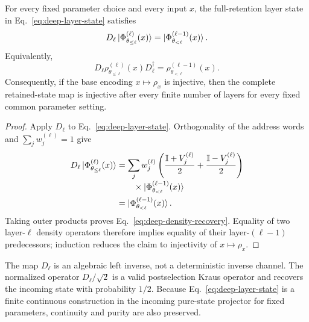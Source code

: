 \documentclass[pdflatex,sn-mathphys,NameDate,iicol]{sn-jnl}
\newcommand{\id}{\mathbb{I}}
\begin{document}
\begin{lemma}
\label{lem:deep-exact-recovery}
For every fixed parameter choice and every input $x$, the full-retention layer
state in Eq.~\eqref{eq:deep-layer-state} satisfies
\begin{equation}
 D_\ell\ket{\Phi_{\theta_{\le\ell}}^{(\ell)}(x)}
 =\ket{\Phi_{\theta_{<\ell}}^{(\ell-1)}(x)}.
 \label{eq:deep-vector-recovery}
\end{equation}
Equivalently,
\begin{equation}
 D_\ell\rho_{\theta_{\le\ell}}^{(\ell)}(x)D_\ell^\dagger
 =\rho_{\theta_{<\ell}}^{(\ell-1)}(x).
 \label{eq:deep-density-recovery}
\end{equation}
Consequently, if the base encoding $x\mapsto\rho_x$ is injective, then the
complete retained-state map is injective after every finite number of layers
for every fixed common parameter setting.
\end{lemma}

\begin{proof}
Apply $D_\ell$ to Eq.~\eqref{eq:deep-layer-state}. Orthogonality of the
address words and $\sum_jw_j^{(\ell)}=1$ give
\begin{align}
 D_\ell\ket{\Phi_{\theta_{\le\ell}}^{(\ell)}(x)}
 &=\sum_jw_j^{(\ell)}
 \left(
   \frac{\id+V_j^{(\ell)}}{2}
  +\frac{\id-V_j^{(\ell)}}{2}
 \right)\nonumber\\[-1mm]
 &\qquad\times
 \ket{\Phi_{\theta_{<\ell}}^{(\ell-1)}(x)}\nonumber\\
 &=\ket{\Phi_{\theta_{<\ell}}^{(\ell-1)}(x)}.
\end{align}
Taking outer products proves Eq.~\eqref{eq:deep-density-recovery}. Equality
of two layer-$\ell$ density operators therefore implies equality of their
layer-$(\ell-1)$ predecessors; induction reduces the claim to injectivity of
$x\mapsto\rho_x$.
\end{proof}

The map $D_\ell$ is an algebraic left inverse, not a deterministic inverse
channel. The normalized operator $D_\ell/\sqrt2$ is a valid postselection
Kraus operator and recovers the incoming state with probability $1/2$.
Because Eq.~\eqref{eq:deep-layer-state} is a finite continuous construction
in the incoming pure-state projector for fixed parameters, continuity and
purity are also preserved.
\end{document}
